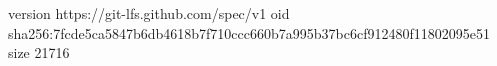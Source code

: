 version https://git-lfs.github.com/spec/v1
oid sha256:7fcde5ca5847b6db4618b7f710ccc660b7a995b37bc6cf912480f11802095e51
size 21716
